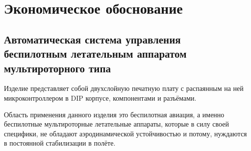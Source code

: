 \section{Экономическое обоснование}








\subsection{Автоматическая система управления \\
  беспилотным летательным аппаратом\\
мультироторного типа}

Изделие представляет собой двухслойную печатную плату с распаянным на
ней микроконтроллером в DIP корпусе, компонентами и
разъёмами.

Область применения данного изделия это беспилотная авиация, а именно
беспилотные мультироторные летательные аппараты, которые в силу своей
специфики, не обладают аэродинамической устойчивостью и потому,
нуждаются в постоянной стабилизации в полёте.

